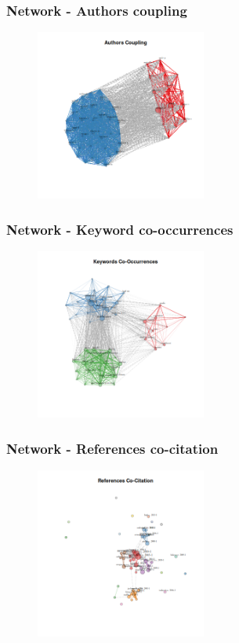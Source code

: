 \documentclass[aspectratio=169]{beamer}
\begin{document}
\begin{frame}
	\frametitle{Network - Authors coupling}
	\begin{figure}
		\centering
		\includegraphics[width=0.5\textwidth]
		{figures/bnet_authors_coupling.png}
	\end{figure}
\end{frame}

\begin{frame}
	\frametitle{Network - Keyword co-occurrences}
	\begin{figure}
		\centering
		\includegraphics[width=0.5\textwidth]
		{figures/bnet_keywords_co-occurrences.png}
	\end{figure}
\end{frame}

\begin{frame}
	\frametitle{Network - References co-citation}
	\begin{figure}
		\centering
		\includegraphics[width=0.5\textwidth]
		{figures/bnet_references_co-citation.png}
	\end{figure}
\end{frame}
\end{document}
